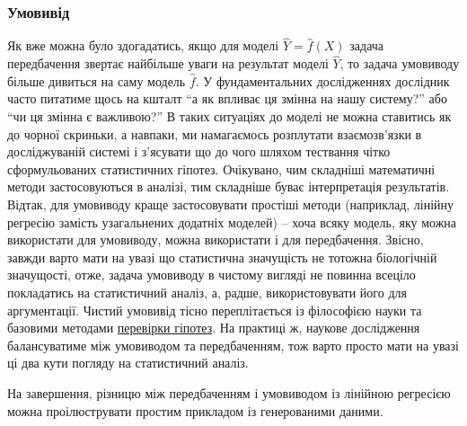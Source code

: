 \documentclass[
  11pt,
]{book}
\begin{document}
\subsubsection{Умовивід}\label{ux443ux43cux43eux432ux438ux432ux456ux434}

Як вже можна було здогадатись, якщо для моделі \(\hat{Y} = \hat{f}(X)\) задача передбачення звертає найбільше уваги на результат моделі \(\hat{Y}\), то задача умовиводу більше дивиться на саму модель \(\hat{f}\). У фундаментальних дослідженнях дослідник часто питатиме щось на кшталт ``а як впливає ця змінна на нашу систему?'' або ``чи ця змінна є важливою?'' В таких ситуаціях до моделі не можна ставитись як до чорної скриньки, а навпаки, ми намагаємось розплутати взаємозв'язки в досліджуваній системі і з'ясувати що до чого шляхом тествання чітко сформульованих статистичних гіпотез. Очікувано, чим складніші математичні методи застосовуються в аналізі, тим складніше буває інтерпретація результатів. Відтак, для умовиводу краще застосовувати простіші методи (наприклад, лінійну регресію замість узагальнених додатніх моделей) -- хоча всяку модель, яку можна використати для умовиводу, можна використати і для передбачення. Звісно, завжди варто мати на увазі що статистична значущість не тотожна біологічній значущості, отже, задача умовиводу в чистому вигляді не повинна всеціло покладатись на статистичний аналіз, а, радше, використовувати його для аргументації. Чистий умовивід тісно переплітається із філософією науки та базовими методами \hyperref[pval]{перевірки гіпотез}. На практиці ж, наукове дослідження балансуватиме між умовиводом та передбаченням, тож варто просто мати на увазі ці два кути погляду на статистичний аналіз.

На завершення, різницю між передбаченням і умовиводом із лінійною регресією можна проілюструвати простим прикладом із генерованими даними.
\end{document}
